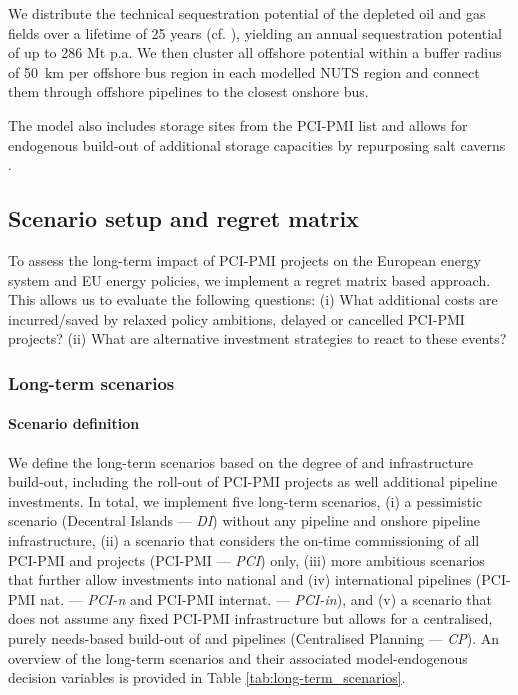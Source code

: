 \documentclass[preprint,12pt,sort&compress]{elsarticle}
\begin{document}
We distribute the technical sequestration potential of the depleted oil and gas fields over a lifetime of 25 years (cf. \cite{hofmannH2CO2Network2025}), yielding an annual sequestration potential of up to 286 Mt p.a. We then cluster all offshore potential within a buffer radius of \SI{50}{km} per offshore bus region in each modelled NUTS region and connect them through offshore  pipelines to the closest onshore bus. 

The model also includes  storage sites from the PCI-PMI list and allows for endogenous build-out of additional storage capacities by repurposing salt caverns \cite{neumannPotentialRoleHydrogen2023}.

\subsection{Scenario setup and regret matrix}
\label{sec:scenario_setup}
To assess the long-term impact of PCI-PMI projects on the European energy system and EU energy policies, we implement a regret matrix based approach. This allows us to evaluate the following questions: (i) What additional costs are incurred/saved by relaxed policy ambitions, delayed or cancelled PCI-PMI projects? (ii) What are alternative investment strategies to react to these events? 
\subsubsection{Long-term scenarios}
\paragraph{Scenario definition}
\label{sec:definition}
We define the long-term scenarios based on the degree of  and  infrastructure build-out, including the roll-out of PCI-PMI projects as well additional pipeline investments. In total, we implement five long-term scenarios, (i) a pessimistic scenario (Decentral Islands --- \textit{DI}) without any  pipeline and onshore  pipeline infrastructure, (ii) a scenario that considers the on-time commissioning of all PCI-PMI  and  projects (PCI-PMI --- \textit{PCI}) only, (iii) more ambitious scenarios that further allow investments into national and (iv) international pipelines (PCI-PMI nat. --- \textit{PCI-n} and PCI-PMI internat. --- \textit{PCI-in}), and (v) a scenario that does not assume any fixed PCI-PMI infrastructure but allows for a centralised, purely needs-based build-out of  and  pipelines (Centralised Planning --- \textit{CP}). An overview of the long-term scenarios and their associated model-endogenous decision variables is provided in Table \ref{tab:long-term_scenarios}. 
\end{document}
